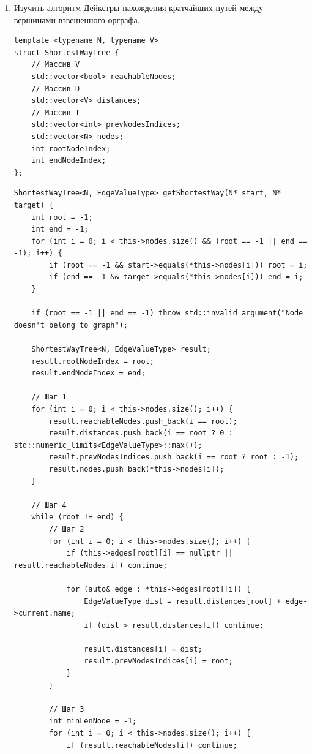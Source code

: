 \documentclass[a4paper,14pt]{extarticle}
\begin{document}
\begin{enumerate}[1.]
    \item Изучить алгоритм Дейкстры нахождения кратчайших путей между вершинами взвешенного орграфа.\\
        \begin{verbatim}
template <typename N, typename V>
struct ShortestWayTree {
    // Массив V
    std::vector<bool> reachableNodes;
    // Массив D
    std::vector<V> distances;
    // Массив T
    std::vector<int> prevNodesIndices;
    std::vector<N> nodes;
    int rootNodeIndex;
    int endNodeIndex;
};
        \end{verbatim}
        \begin{verbatim}
ShortestWayTree<N, EdgeValueType> getShortestWay(N* start, N* target) {
    int root = -1;
    int end = -1;
    for (int i = 0; i < this->nodes.size() && (root == -1 || end == -1); i++) {
        if (root == -1 && start->equals(*this->nodes[i])) root = i;
        if (end == -1 && target->equals(*this->nodes[i])) end = i;
    }

    if (root == -1 || end == -1) throw std::invalid_argument("Node doesn't belong to graph");

    ShortestWayTree<N, EdgeValueType> result;
    result.rootNodeIndex = root;
    result.endNodeIndex = end;

    // Шаг 1
    for (int i = 0; i < this->nodes.size(); i++) {
        result.reachableNodes.push_back(i == root);
        result.distances.push_back(i == root ? 0 : std::numeric_limits<EdgeValueType>::max());
        result.prevNodesIndices.push_back(i == root ? root : -1);
        result.nodes.push_back(*this->nodes[i]);
    }

    // Шаг 4
    while (root != end) {
        // Шаг 2
        for (int i = 0; i < this->nodes.size(); i++) {
            if (this->edges[root][i] == nullptr || result.reachableNodes[i]) continue;

            for (auto& edge : *this->edges[root][i]) {
                EdgeValueType dist = result.distances[root] + edge->current.name;
                if (dist > result.distances[i]) continue;
            
                result.distances[i] = dist;
                result.prevNodesIndices[i] = root;
            }
        }

        // Шаг 3
        int minLenNode = -1;
        for (int i = 0; i < this->nodes.size(); i++) {
            if (result.reachableNodes[i]) continue;


\end{verbatim}
\end{enumerate}
\end{document}
